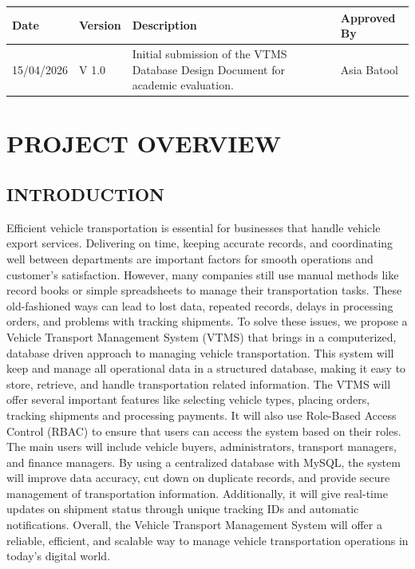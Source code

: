 \documentclass[12pt,a4paper]{report}
\begin{document}
\begin{longtable}{|p{3cm}|p{2cm}|p{6cm}|p{3cm}|}
\hline
\textbf{Date} & \textbf{Version} & \textbf{Description} & \textbf{Approved By} \\
\hline
15/04/2026 & V 1.0 & Initial submission of the VTMS Database Design Document for academic evaluation. & Asia Batool \\
\hline
\end{longtable}

\chapter{PROJECT OVERVIEW}

\section{INTRODUCTION}

 Efficient vehicle transportation is essential for businesses that handle vehicle export services. Delivering on time, keeping accurate records, and coordinating well between departments are important factors for smooth operations and customer's satisfaction. However, many companies still use manual methods like record books or simple spreadsheets to manage their transportation tasks. These old-fashioned ways can lead to lost data, repeated records, delays in processing orders, and problems with tracking shipments.
To solve these issues, we propose a Vehicle Transport Management System (VTMS) that brings in a computerized, database driven approach to managing vehicle transportation. This system will keep and manage all operational data in a structured database, making it easy to store, retrieve, and handle transportation related information.
The VTMS will offer several important features like selecting vehicle types, placing orders, tracking shipments and processing payments. It will also use Role-Based Access Control (RBAC) to ensure that users can access the system based on their roles. The main users will include vehicle buyers, administrators, transport managers, and finance managers.
By using a centralized database with MySQL, the system will improve data accuracy, cut down on duplicate records, and provide secure management of transportation information. Additionally, it will give real-time updates on shipment status through unique tracking IDs and automatic notifications. Overall, the Vehicle Transport Management System will offer a reliable, efficient, and scalable way to manage vehicle transportation operations in today's digital world.
\end{document}
